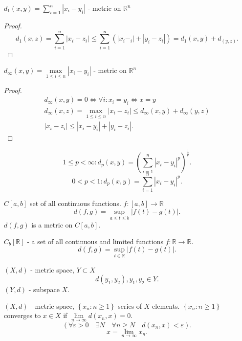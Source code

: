 \begin{example}
    $d_1(x, y) = \sum_{i=1}^{n} \left| x_i - y_i \right|$ - metric on $\mathbb{R}^{n}$

    \begin{proof}
    \[
    d_1(x, z) = \sum_{i=1}^{n} \left| x_i - z_i \right| \leq \sum_{i=1}^{n} \left( \left| x_i - _i \right| + \left| y_i - z_i \right|  \right) =
    d_1(x, y) + d_(y, z)
    .\] 
    \end{proof}

    $d_{\infty} (x, y) = \underset{1\leq i \leq n}{\max} \left| x_i - y_i \right|$ - metric on $\mathbb{R}^{n}$
    
    \begin{proof}
        \begin{align*}
        d_{\infty}(x, y) = 0 \iff \forall i : x_i = y_i \iff x = y \\ 
        d_{\infty}(x, z) = \underset{1\leq i \leq n}{\max} \left| x_i - z_i \right|  \leq d_{\infty}(x, y) + d_{\infty}(y, z) \\
        \left| x_i - z_i \right| \leq \left| x_i - y_i \right| + \left| y_i - z_i \right|        
        .\end{align*}
    \end{proof}
    \[
    1 \leq p < \infty : d_{p} (x, y) = \left( \sum_{i=1}^{n} \left| x_i - y_i \right| ^{p} \right) ^{\frac{1}{p}}
    .\] 
    \[
    0 < p < 1 : d_{p}(x, y) = \sum_{i=1}^{n} \left| x_i - y_i \right| ^{p}
    .\] 

\end{example}

\begin{example}
$C[a, b]$ set of all continuous functions.
$f: [a, b] \to \mathbb{R}$
\[
d(f, g) = \underset{a \leq t \leq b}{\sup} \left| f(t) - g(t) \right| 
.\] 
$d(f, g)$ is a metric on $C[a, b]$.
\end{example}

\begin{example}
    $C_b[\mathbb{R}]$ - a set of all continuous and limited functions $f: \mathbb{R} \to \mathbb{R}$.
    \[
    d(f, g) = \underset{t \in \mathbb{R}}{\sup} \left| f(t) - g(t) \right| 
    .\] 
\end{example}
\begin{example}
    $(X, d)$ - metric space, $Y \subset X$
    \[
    d(y_1, y_2), y_1, y_2 \in Y
    .\] 
    $(Y, d)$ - subspace $X$.
\end{example}

\begin{definition}
    $\left( X, d \right) $ - metric space, $\left\{ x_n : n\geq 1 \right\} $
    series of $X$ elements. $\left\{ x_n : n\geq 1 \right\} $ converges to $x \in X$ if $\underset{n\to\infty}{\lim} d(x_n, x) = 0$.
    \[
        \left( \forall \varepsilon > 0 \quad \exists N \quad \forall n \geq N \quad d(x_n, x) < \varepsilon \right) 
    .\] 
    \[
    x = \lim_{n \to \infty} x_n
    .\] 
\end{definition}

